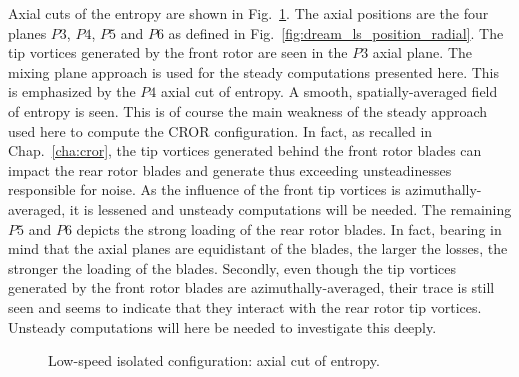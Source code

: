 Axial cuts of the entropy are shown in Fig.~\ref{fig:dream_ls_steady_entropy}.
The axial positions are the four planes $P3$, $P4$, $P5$
and $P6$ as defined in Fig.~\ref{fig:dream_ls_position_radial}.
The tip vortices generated by the front rotor are seen in the $P3$
axial plane. The mixing plane approach is used for the steady computations
presented here. This is emphasized by the $P4$ axial cut of entropy. A
smooth, spatially-averaged field of entropy is seen. This is of course the main
weakness of the steady approach used here to compute the CROR configuration.
In fact, as recalled in Chap.~\ref{cha:cror}, the tip vortices generated behind the
front rotor blades can impact the rear rotor blades and generate thus 
exceeding unsteadinesses responsible for noise. As the influence
of the front tip vortices is azimuthally-averaged, it is
lessened and unsteady computations will be needed.
The remaining $P5$ and $P6$ depicts the strong loading
of the rear rotor blades. In fact, bearing in mind that the
axial planes are equidistant of the blades, the larger the losses,
the stronger the loading of the blades. Secondly, even though the
tip vortices generated by the front rotor 
blades are azimuthally-averaged,
their trace is still seen and seems to indicate that they
interact with the rear rotor tip vortices. Unsteady computations will
here be needed to investigate this deeply.
\begin{figure}
  \centering
  \caption{Low-speed isolated configuration: axial cut of entropy.}
   \label{fig:dream_ls_steady_entropy}
\end{figure}